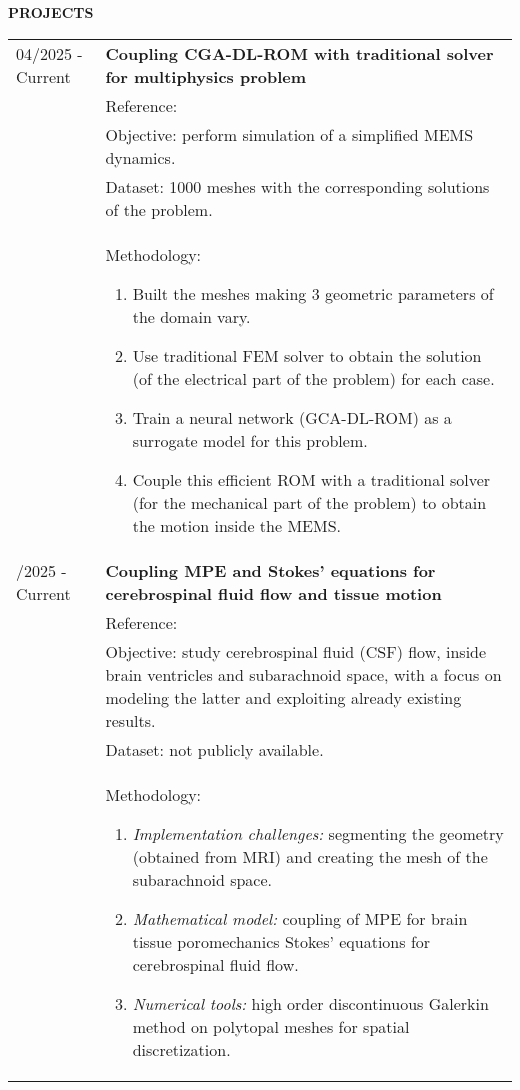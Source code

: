 \documentclass[10pt,a4paper]{article}
\makeatletter
\newcommand{\cvsection}[3][1.2]{%
  \renewcommand{\arraystretch}{1} %
  \faCaretRight \; \textbf{#2}

  \renewcommand{\arraystretch}{#1}%
  \begin{longtable}{
    >{\raggedleft\arraybackslash}p{0.20\textwidth}
    @{\hspace{1cm}}
    >{\raggedright\arraybackslash}p{0.68\textwidth}
  }
    \endfirsthead
    \endhead
    \endfoot
    \endlastfoot
    #3
  \end{longtable}

  \renewcommand{\arraystretch}{1}%
  \vspace{1em}%
}
\makeatother
\begin{document}
{    \cvsection{PROJECTS}{
        04/2025 - Current &    \textbf{Coupling CGA-DL-ROM with traditional solver for multiphysics problem} \\
        & Reference: \href{https://arxiv.org/abs/2411.05486v1}{\faLink} \\
        & Objective: perform simulation of a simplified MEMS dynamics.\\
        & Dataset: 1000 meshes with the corresponding solutions of the problem.\\
        & Methodology:
        \begin{enumerate}[leftmargin=*,nosep]
            \item Built the meshes making 3 geometric parameters of the domain vary.
            \item Use traditional FEM solver to obtain the solution (of the electrical part of
                  the problem) for each case.
            \item Train a neural network (GCA-DL-ROM) as a surrogate model for this problem.
            \item Couple this efficient ROM with a traditional solver (for the mechanical part of
                  the problem) to obtain the motion inside the MEMS.
        \end{enumerate}\\

        04/2025 - Current & \textbf{Coupling MPE and Stokes' equations for cerebrospinal fluid flow and tissue motion} \\
        & Reference: \href{https://fluidsbarrierscns.biomedcentral.com/articles/10.1186/s12987-022-00376-2}{\faLink} \\
        & Objective: study cerebrospinal fluid (CSF) flow, inside brain ventricles and subarachnoid space, with a focus on modeling the latter and exploiting already existing results. \\
        & Dataset: not publicly available. \\
        & Methodology:
        \begin{enumerate}[leftmargin=*,nosep]
            \item \textit{Implementation challenges:} segmenting the geometry (obtained from MRI) and
                  creating the mesh of the subarachnoid space.
            \item \textit{Mathematical model:} coupling of MPE for brain tissue poromechanics Stokes'
                  equations for cerebrospinal fluid flow.
            \item \textit{Numerical tools:} high order discontinuous Galerkin method on polytopal meshes
                  for spatial discretization.
        \end{enumerate}\\

}}
\end{document}
